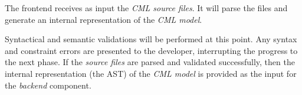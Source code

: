 The frontend receives as input the \emph{CML source files}.
It will parse the files and generate an internal representation of the \emph{CML model}.

Syntactical and semantic validations will be performed at this point.
Any syntax and constraint errors are presented to the developer, interrupting the progress to the next phase.
If the \emph{source files} are parsed and validated successfully, then the internal representation (the AST) of the \emph{CML model} is provided as the input for the \emph{backend} component.
